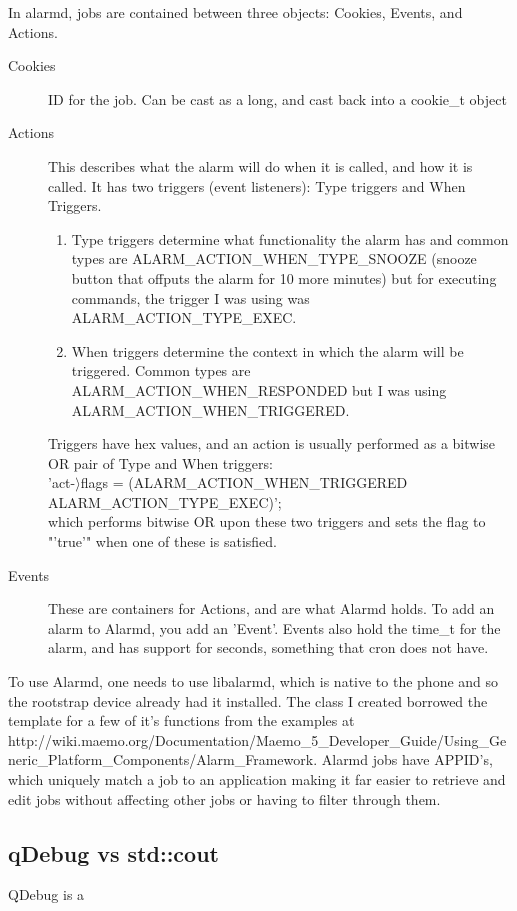 \documentclass[11pt]{article} %
\begin{document}
In alarmd, jobs are contained between three objects: Cookies, Events, and Actions.
\begin{description}
  \item[Cookies] ID for the job. Can be cast as a long, and cast back into a cookie\_t object
  \item[Actions] This describes what the alarm will do when it is called, and how it is called. It has two triggers (event listeners): Type triggers and When Triggers.
\begin{enumerate}
\item Type triggers determine what functionality the alarm has and common types are ALARM\_ACTION\_WHEN\_TYPE\_SNOOZE (snooze button that offputs the alarm for 10 more minutes) but for executing commands, the trigger I was using was ALARM\_ACTION\_TYPE\_EXEC. 
\item When triggers determine the context in which the alarm will be triggered. Common types are ALARM\_ACTION\_WHEN\_RESPONDED but I was using ALARM\_ACTION\_WHEN\_TRIGGERED.
\end{enumerate}
Triggers have hex values, and an action is usually performed as a bitwise OR pair of Type and When triggers:\\
'act-\(\rangle\)flags \textbar= (ALARM\_ACTION\_WHEN\_TRIGGERED \textbar ALARM\_ACTION\_TYPE\_EXEC)';\\
which performs bitwise OR upon these two triggers and sets the flag to "'true'" when one of these is satisfied.
 \item[Events] These are containers for Actions, and are what Alarmd holds. To add an alarm to Alarmd, you add an 'Event'. Events also hold the time\_t for the alarm, and has support for  seconds, something that cron does not have.
\end{description}

To use Alarmd, one needs to use libalarmd, which is native to the phone and so the rootstrap device already had it installed. The class I created borrowed the template for a few of it's functions from the examples at http://wiki.maemo.org/Documentation/Maemo\_5\_Developer\_Guide/Using\_Generic\_Platform\_Components/Alarm\_Framework. 
Alarmd jobs have APPID's, which uniquely match a job to an application making it far easier to retrieve and edit jobs without affecting other jobs or having to filter through them.

\subsection{qDebug vs std::cout}
QDebug is a 
\end{document}
